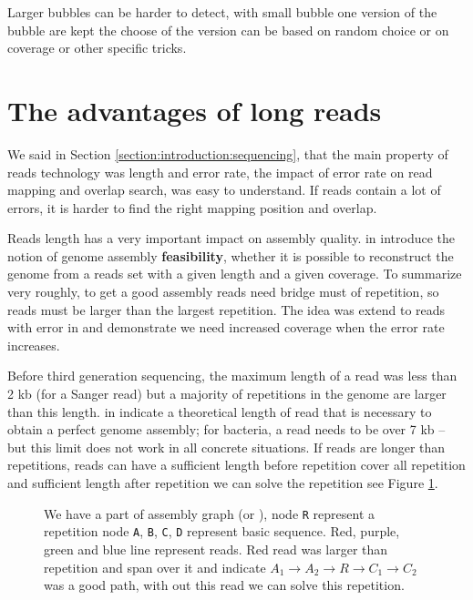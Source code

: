 \documentclass[main]{subfiles}
\begin{document}
Larger bubbles can be harder to detect, with small bubble one version of the bubble are kept the choose of the version can be based on random choice or on coverage or other specific tricks.

\section{The advantages of long reads}

We said in Section \ref{section:introduction:sequencing}, that the main property of reads technology was length and error rate, the impact of error rate on read mapping and overlap search, was easy to understand. If reads contain a lot of errors, it is harder to find the right mapping position and overlap.

Reads length has a very important impact on assembly quality. \citeauthor{Bresler_Tse} in \cite{Bresler_Tse} introduce the notion of genome assembly \textbf{feasibility}, whether it is possible to reconstruct the genome from a reads set with a given length and a given coverage. To summarize very roughly, to get a good assembly reads need bridge must of repetition, so reads must be larger than the largest repetition. The idea was extend to reads with error in \cite{feasibility_with_error} and demonstrate we need increased coverage when the error rate increases.

Before third generation sequencing, the maximum length of a read was less than 2 kb (for a Sanger read) but a majority of repetitions in the genome are larger than this length. \citeauthor{one_chromosome_one_contig} in \cite{one_chromosome_one_contig} indicate a theoretical length of read that is necessary to obtain a perfect genome assembly; for bacteria, a read needs to be over 7 kb – but this limit does not work in all concrete situations. If reads are longer than repetitions, reads can have a sufficient length before repetition cover all repetition and sufficient length after repetition we can solve the repetition see Figure \ref{intro:fig:whylongreads}.

\begin{figure}[ht]
    \centering
    
    \caption{We have a part of assembly graph (\OLC or \DBG), node \texttt{R} represent a repetition node \texttt{A}, \texttt{B}, \texttt{C}, \texttt{D} represent basic sequence. Red, purple, green and blue line represent reads. Red read was larger than repetition and span over it and indicate $A_1 \rightarrow A_2 \rightarrow R \rightarrow C_1 \rightarrow C_2$ was a good path, with out this read we can solve this repetition.}
    \label{intro:fig:whylongreads}
\end{figure}
\end{document}
